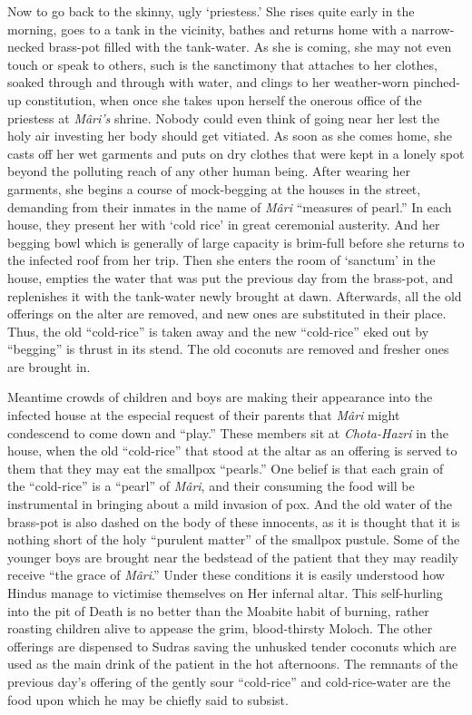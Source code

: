 \documentclass[a4paper, 12pt, oneside, english]{article}
\begin{document}
Now to go back to the skinny, ugly `priestess.' She rises quite early in the morning, goes to a tank in the vicinity, bathes and returns home with a narrow-necked brass-pot filled with the tank-water. As she is coming, she may not even touch or speak to others, such is the sanctimony that attaches to her clothes, soaked through and through with water, and clings to her weather-worn pinched-up constitution, when once she takes upon herself the onerous office of the priestess at \emph{Mâri's} shrine. Nobody could even think of going near her lest the holy air investing her body should get vitiated. As soon as she comes home, she casts off her wet garments and puts on dry clothes that were kept in a lonely spot beyond the polluting reach of any other human being. After wearing her garments, she begins a course of mock-begging at the houses in the street, demanding from their inmates in the name of \emph{Mâri} ``measures of pearl.'' In each house, they present her with `cold rice' in great ceremonial austerity. And her begging bowl which is generally of large capacity is brim-full before she returns to the infected roof from her trip. Then she enters the room of `sanctum' in the house, empties the water that was put the previous day from the brass-pot, and replenishes it with the tank-water newly brought at dawn. Afterwards, all the old offerings on the alter are removed, and new ones are substituted in their place. Thus, the old ``cold-rice'' is taken away and the new ``cold-rice'' eked out by ``begging'' is thrust in its stend. The old coconuts are removed and fresher ones are brought in.

Meantime crowds of children and boys are making their appearance into the infected house at the especial request of their parents that \emph{Mâri} might condescend to come down and ``play.'' These members sit at \emph{Chota-Hazri} in the house, when the old ``cold-rice'' that stood at the altar as an offering is served to them that they may eat the smallpox ``pearls.'' One belief is that each grain of the ``cold-rice'' is a ``pearl'' of \emph{Mâri}, and their consuming the food will be instrumental in bringing about a mild invasion of pox. And the old water of the brass-pot is also dashed on the body of these innocents, as it is thought that it is nothing short of the holy ``purulent matter'' of the smallpox pustule. Some of the younger boys are brought near the bedstead of the patient that they may readily receive ``the grace of \emph{Mâri}.'' Under these conditions it is easily understood how Hindus manage to victimise themselves on Her infernal altar. This self-hurling into the pit of Death is no better than the Moabite habit of burning, rather roasting children alive to appease the grim, blood-thirsty Moloch. The other offerings are dispensed to Sudras saving the unhusked tender coconuts which are used as the main drink of the patient in the hot afternoons. The remnants of the previous day's offering of the gently sour ``cold-rice'' and cold-rice-water are the food upon which he may be chiefly said to subsist.
\end{document}

